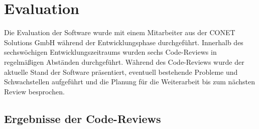 \section{Evaluation}
Die Evaluation der Software wurde mit einem Mitarbeiter aus der CONET Solutions GmbH während der Entwicklungsphase durchgeführt. Innerhalb des sechswöchigen Entwicklungszeitraums wurden sechs Code-Reviews in regelmäßigen Abständen durchgeführt. Während des Code-Reviews wurde der aktuelle Stand der Software präsentiert, eventuell bestehende Probleme und Schwachstellen aufgeführt und die Planung für die Weiterarbeit bis zum nächsten Review besprochen.

\subsection{Ergebnisse der Code-Reviews}
